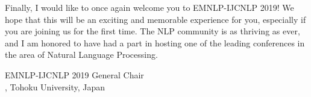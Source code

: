 Finally, I would like to once again welcome you to EMNLP-IJCNLP 2019! We hope that this will be an exciting and memorable experience for you, especially if you are joining us for the first time. The NLP community is as thriving as ever, and I am honored to have had a part in hosting one of the leading conferences in the area of Natural Language Processing.


\vspace{3em}
\noindent
EMNLP-IJCNLP 2019 General Chair\\


, Tohoku University, Japan\\




